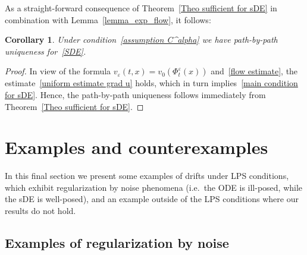 \documentclass[a4paper,10pt]{article}
\newtheorem{corollary}[theorem]{Corollary}
\newcommand\1{\mathbbm{1}}
\newcommand{\eps}{\varepsilon}
\numberwithin{equation}{section}
\begin{document}
As a straight-forward consequence of Theorem~\ref{Theo sufficient for sDE} in combination with Lemma~\ref{lemma_exp_flow}, it follows:

\begin{corollary}
\label{Corollary sDE Holder}Under condition~\eqref{assumption C^alpha} we have path-by-path uniqueness for~\eqref{SDE}.
\end{corollary}

\begin{proof}
In view of the formula $v_{\eps}(t,x)  =v_{0}(\Phi^{\eps}_t(x))$ and~\eqref{flow estimate}, the estimate~\eqref{uniform estimate grad u} holds, which in turn implies~\eqref{main condition for sDE}. Hence, the path-by-path uniqueness follows immediately from Theorem~\ref{Theo sufficient for sDE}.
\end{proof}


\section{Examples and counterexamples}\label{ex_section}

In this final section we present some examples of drifts under LPS conditions, which exhibit regularization by noise phenomena (i.e.~the ODE is ill-posed, while the sDE is well-posed), and an example outside of the LPS conditions where our results do not hold.

\subsection{Examples of regularization by noise}
\end{document}
